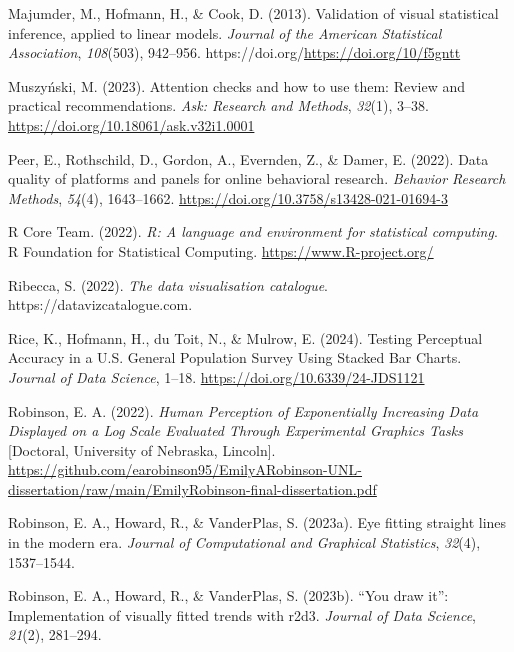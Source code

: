 \documentclass[
  10pt,
  letterpaper,
  DIV=11,
  numbers=noendperiod]{scrartcl}
\newlength{\cslhangindent}
\newenvironment{CSLReferences}[2] %
 {\begin{list}{}{%
  \setlength{\itemindent}{0pt}
  \setlength{\leftmargin}{0pt}
  \setlength{\parsep}{0pt}
  \ifodd #1
   \setlength{\leftmargin}{\cslhangindent}
   \setlength{\itemindent}{-1\cslhangindent}
  \fi
  \setlength{\itemsep}{#2\baselineskip}}}
 {\end{list}}
\begin{document}
\begin{CSLReferences}{1}{0}
Majumder, M., Hofmann, H., \& Cook, D. (2013). Validation of visual
statistical inference, applied to linear models. \emph{Journal of the
American Statistical Association}, \emph{108}(503), 942--956.
https://doi.org/\url{https://doi.org/10/f5gntt}

Muszyński, M. (2023). Attention checks and how to use them: {Review} and
practical recommendations. \emph{Ask: Research and Methods},
\emph{32}(1), 3--38. \url{https://doi.org/10.18061/ask.v32i1.0001}

Peer, E., Rothschild, D., Gordon, A., Evernden, Z., \& Damer, E. (2022).
Data quality of platforms and panels for online behavioral research.
\emph{Behavior Research Methods}, \emph{54}(4), 1643--1662.
\url{https://doi.org/10.3758/s13428-021-01694-3}

R Core Team. (2022). \emph{R: A language and environment for statistical
computing}. R Foundation for Statistical Computing.
\url{https://www.R-project.org/}

Ribecca, S. (2022). \emph{The data visualisation catalogue}.
https://datavizcatalogue.com.

Rice, K., Hofmann, H., du Toit, N., \& Mulrow, E. (2024). Testing
{Perceptual Accuracy} in a {U}.{S}. {General Population Survey Using
Stacked Bar Charts}. \emph{Journal of Data Science}, 1--18.
\url{https://doi.org/10.6339/24-JDS1121}

Robinson, E. A. (2022). \emph{Human {Perception} of {Exponentially}
{Increasing} {Data} {Displayed} on a {Log} {Scale} {Evaluated} {Through}
{Experimental} {Graphics} {Tasks}} {[}Doctoral, University of Nebraska,
Lincoln{]}.
\url{https://github.com/earobinson95/EmilyARobinson-UNL-dissertation/raw/main/EmilyRobinson-final-dissertation.pdf}

Robinson, E. A., Howard, R., \& VanderPlas, S. (2023a). Eye fitting
straight lines in the modern era. \emph{Journal of Computational and
Graphical Statistics}, \emph{32}(4), 1537--1544.

Robinson, E. A., Howard, R., \& VanderPlas, S. (2023b). {``You draw
it''}: Implementation of visually fitted trends with r2d3. \emph{Journal
of Data Science}, \emph{21}(2), 281--294.


\end{CSLReferences}
\end{document}
